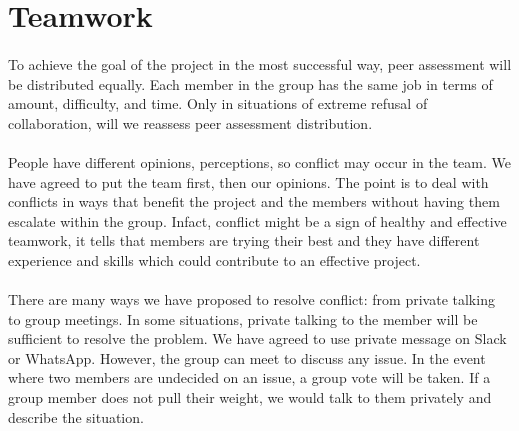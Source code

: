 \documentclass[11pt, a4]{article}
\begin{document}
\section{Teamwork}\label{team}
\paragraph{}
To achieve the goal of the project in the most successful way, peer assessment will be distributed equally. Each member in the group has the same job in terms of amount, difficulty, and time. Only in situations of extreme
refusal of collaboration, will we reassess peer assessment distribution.
\paragraph{}
People have different opinions, perceptions, so conflict may occur in the team. We have agreed to put the team first, then our opinions. The point is to deal with conflicts in ways that benefit the project and the members without having them escalate within the group. Infact, conflict might be a sign of healthy and effective teamwork, it tells that members are trying their best and they have different experience and skills which could contribute to an effective project.
\paragraph{}
There are many ways we have proposed to resolve conflict: from private talking to group meetings. In some situations, private talking to the member will be sufficient to resolve the problem. We have agreed to use private message on Slack or WhatsApp.  However, the group can meet to discuss any issue. In the event where two members are undecided on an issue, a group vote will be taken. If a group member does not pull their weight, we would talk to them privately and describe the situation.
\end{document}
